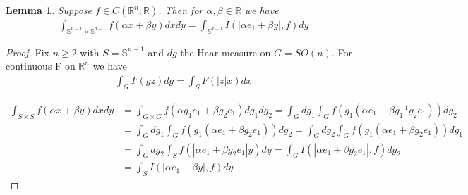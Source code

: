 \documentclass[10pt]{article}
\newcommand{\1}{\textbf{1}}
\newcommand{\R}{\mathbb{R}}
\newtheorem{lemma}[theorem]{Lemma}
\theoremstyle{remark}
\theoremstyle{definition}
\begin{document}
\begin{lemma}
	Suppose $f \in C(\R^n;\R)$. Then for $\alpha, \beta \in \R$ we have
	\begin{align*}
		\int_{\mathbb{S}^{n-1}\times \mathbb{S}^{d-1}}f(\alpha x + \beta y) dx dy = \int_{\mathbb{S}^{d-1}} I(|\alpha e_1 + \beta y|,f)dy
	\end{align*}
\end{lemma}

\begin{proof}
	Fix $n \geq 2$ with $S = \mathbb{S}^{n-1}$ and $dg$ the Haar measure on $G = SO(n)$. For continuous F on $\mathbb{R}^n$ we have
	\begin{align*}
		\int_G F(gz)dg = \int_S F(|z|x)dx
	\end{align*}

	\begin{align*}
		\int_{S \times S} f(\alpha x + \beta y) dxdy &= \int_{G \times G} f(\alpha g_1 e_1 + \beta g_2 e_1) dg_1dg_2 = \int_G dg_1 \int_G f(g_1(\alpha e_1 + \beta g_1^{-1} g_2 e_1))dg_2 \\ 
		&= \int_G dg_1 \int_G f(g_1(\alpha e_1 + \beta g_2 e_1))dg_2 = \int_G dg_2 \int_G f(g_1(\alpha e_1 + \beta g_2 e_1)) dg_1 \\
		&= \int_G dg_2 \int_S f(|\alpha e_1 + \beta g_2 e_1|y)dy = \int_G I(|\alpha e_1 + \beta g_2 e_1|,f)dg_2\\
		&= \int_S I(|\alpha e_1 + \beta y|,f)dy
	\end{align*}
\end{proof}
\end{document}
